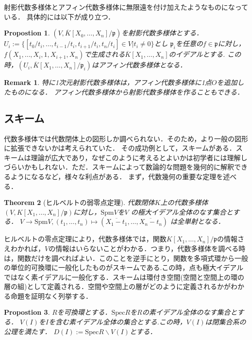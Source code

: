 \documentclass{ujarticle}
\newtheorem{thm}{Theorem}[section]
\newtheorem{prop}[thm]{Propostion}
\newtheorem*{rem}{Remark}
\begin{document}
射影代数多様体とアフィン代数多様体に無限遠を付け加えたようなものになっている．
具体的には以下が成り立つ．

\begin{prop}
$(V,\overline{K}[X_0 ,\dots,X_n]/\mathfrak{p})$を射影代数多様体とする．
$U_i :=\{[t_0/t_i,\dots,t_{i-1}/t_i,t_{i+1}/t_i,t_n/t_i]\in V | t_i \neq 0\}$とし
$\mathfrak{p}_i$を任意の$f\in \mathfrak{p}$に対し，$f(X_1,\dots,X_i,1,X_{i+1},X_n)$で生成される$\overline{K}[X_1,\dots,X_n]$のイデアルとする.
この時，$(U_i,\overline{K}[X_1,\dots,X_n]/\mathfrak{p}_i)$はアフィン代数多様体となる．
\end{prop}
\begin{rem}
  特に1次元射影代数多様体は，アフィン代数多様体に1点$O$を追加したものになる．
  アフィン代数多様体から射影代数多様体を作ることもできる．
\end{rem}

\subsection{スキーム}
\label{sub:スキーム}
代数多様体では代数閉体上の図形しか調べられない．そのため，より一般の図形に拡張できないかは考えられていた．
その成功例として，スキームがある．スキームは理論が広大であり，なぜこのように考えるとよいかは初学者には理解しづらいかもしれない．ただ．スキームによって数論的な問題を幾何的に解釈できるようになるなど，様々な利点がある．
まず，代数幾何の重要な定理を述べる．
\begin{thm}[ヒルベルトの弱零点定理]
代数閉体$K$上の代数多様体$(V,K[X_1,\dots,X_n]/\mathfrak{p})$に対し，$\mathrm{Spm}V$を$V$
の極大イデアル全体のなす集合とする．
$V \to \mathrm{Spm}V,(t_1,\dots,t_n)\mapsto (\overline{X_1 - t_1},\dots,\overline{X_n - t_n})$
は全単射となる．
\end{thm}

ヒルベルトの零点定理により，代数多様体では，関数$K[X_1,\dots,X_n]/\mathfrak{p}$の情報さえわかれば，$V$の情報はいらないことがわかる．つまり，代数多様体を調べる時は，関数だけを調べればよい．このことを逆手にとり，関数を多項式環から一般の単位的可換環に一般化したものがスキームである.この時，点も極大イデアルではなく素イデアルに一般化する．スキームは環付き空間(空間と空間上の環の層の組)として定義される．空間や空間上の層がどのように定義されるかがわかる命題を証明なく列挙する．

\begin{prop}
$R$を可換環とする．$\mathrm{Spec}R$を$R$の素イデアル全体のなす集合とする．
$V(I)$を$I$を含む素イデアル全体の集合とする.この時，$V(I)$は閉集合系の公理を満たす．
$D(I):=\mathrm{Spec}R \backslash V(I)$とする．
\end{prop}
\end{document}
